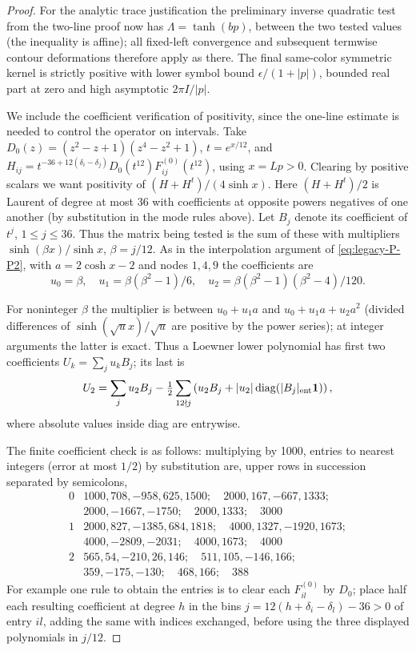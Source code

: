 \begin{proof}
For the analytic trace justification the preliminary inverse quadratic test from the two-line proof now has \(\Lambda=\tanh(bp)\), between the two tested values (the inequality is affine); all fixed-left convergence and subsequent termwise contour deformations therefore apply as there. The final same-color symmetric kernel is strictly positive with lower symbol bound \(\epsilon/(1+|p|)\), bounded real part at zero and high asymptotic \(2\pi I/|p|\).

We include the coefficient verification of positivity, since the one-line estimate is needed to control the operator on intervals. Take \(D_0(z)=(z^2-z+1)(z^4-z^2+1)\), \(t=e^{x/12}\), and \(H_{ij}=t^{-36+12(\delta_i-\delta_j)}D_0(t^{12})F_{ij}^{(0)}(t^{12})\), using \(x=Lp>0\). Clearing by positive scalars we want positivity of \((H+H^t)/(4\sinh x)\). Here \((H+H^t)/2\) is Laurent of degree at most 36 with coefficients at opposite powers negatives of one another (by substitution in the mode rules above). Let \(B_j\) denote its coefficient of \(t^j\), \(1\le j\le36\). Thus the matrix being tested is the sum of these with multipliers \(\sinh(\beta x)/\sinh x\), \(\beta=j/12\). As in the interpolation argument of \eqref{eq:legacy-P-P2}, with \(a=2\cosh x-2\) and nodes \(1,4,9\) the coefficients are
\[
 u_0=\beta,\quad u_1=\beta(\beta^2-1)/6,\quad u_2=\beta(\beta^2-1)(\beta^2-4)/120.
\]

For noninteger \(\beta\) the multiplier is between \(u_0+u_1a\) and \(u_0+u_1a+u_2a^2\) (divided differences of \(\sinh(\sqrt u x)/\sqrt u\) are positive by the power series); at integer arguments the latter is exact. Thus a Loewner lower polynomial has first two coefficients \(U_k=\sum_j u_k B_j\); its last is
\[
 U_2=\sum_j u_2 B_j-\tfrac12\sum_{12\nmid j}\left(u_2 B_j+|u_2|\operatorname{diag}(|B_j|_{\rm ent}{\bf1})\right),
\]
where absolute values inside diag are entrywise.



The finite coefficient check is as follows: multiplying by 1000, entries to nearest integers (error at most \(1/2\)) by substitution are, upper rows in succession separated by semicolons,
\[
\begin{array}{c|l}
0&1000,708,-958,625,1500;\quad2000,167,-667,1333;\\
 &2000,-1667,-1750;\quad2000,1333;\quad3000\\
 1&2000,827,-1385,684,1818;\quad4000,1327,-1920,1673;\\
 &4000,-2809,-2031;\quad4000,1673;\quad4000\\
 2&565,54,-210,26,146;\quad511,105,-146,166;\\
 &359,-175,-130;\quad468,166;\quad388
\end{array}
\]
For example one rule to obtain the entries is to clear each \(F^{(0)}_{il}\) by \(D_0\); place half each resulting coefficient at degree \(h\) in the bins \(j=12(h+\delta_i-\delta_l)-36>0\) of entry \(il\), adding the same with indices exchanged, before using the three displayed polynomials in \(j/12\).


\end{proof}

